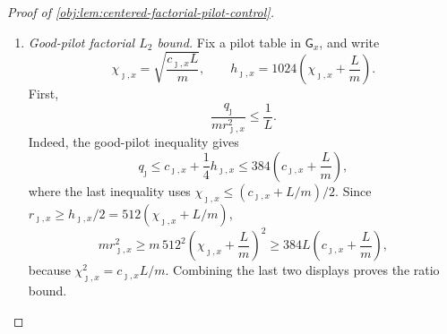 \documentclass[11pt]{article}
\begin{document}
\begin{proof}[Proof of \cref{obj:lem:centered-factorial-pilot-control}]
\begin{enumerate}
\item \label{item:pf-good-pilot-factorial-ltwo}\emph{Good-pilot factorial \(L_2\) bound.}
Fix a pilot table in \(\mathsf G_x\), and write
\[
\chi_{\jmath,x}=\sqrt{\frac{c_{\jmath,x}L}{m}},
\qquad
h_{\jmath,x}=1024\left(\chi_{\jmath,x}+\frac Lm\right).
\]
First,
\[
\frac{q_\jmath}{m r_{\jmath,x}^2}\le\frac1L .
\]
Indeed, the good-pilot inequality gives
\[
q_\jmath\le c_{\jmath,x}+\frac14h_{\jmath,x}
\le 384\left(c_{\jmath,x}+\frac Lm\right),
\]
where the last inequality uses
\(\chi_{\jmath,x}\le (c_{\jmath,x}+L/m)/2\).  Since
\(r_{\jmath,x}\ge h_{\jmath,x}/2=512(\chi_{\jmath,x}+L/m)\),
\[
m r_{\jmath,x}^2
\ge
m\,512^2\left(\chi_{\jmath,x}+\frac Lm\right)^2
\ge
384L\left(c_{\jmath,x}+\frac Lm\right),
\]
because \(\chi_{\jmath,x}^2=c_{\jmath,x}L/m\).  Combining the last two displays proves the ratio bound.


\end{enumerate}
\end{proof}
\end{document}
